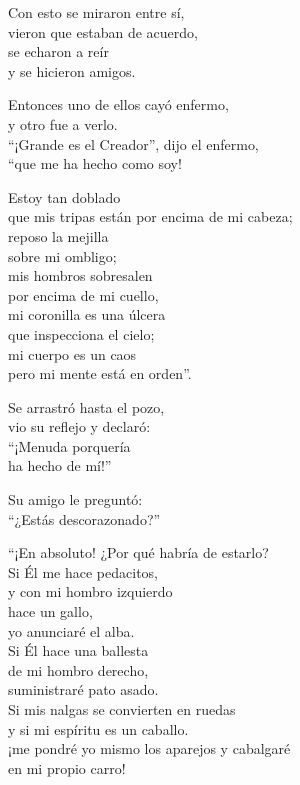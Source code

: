 \documentclass[hidelinks]{memoir}
\begin{document}
	Con esto se miraron entre sí,\\
	vieron que estaban de acuerdo,\\
	se echaron a reír\\
	y se hicieron amigos.
	
	Entonces uno de ellos cayó enfermo,\\
	y otro fue a verlo.\\
	``¡Grande es el Creador'', dijo el enfermo,\\
	``que me ha hecho como soy!
	
	Estoy tan doblado\\
	que mis tripas están por encima de mi cabeza;\\
	reposo la mejilla\\
	sobre mi ombligo;\\
	mis hombros sobresalen\\
	por encima de mi cuello,\\
	mi coronilla es una úlcera\\
	que inspecciona el cielo;\\
	mi cuerpo es un caos\\
	pero mi mente está en orden''.
	
	Se arrastró hasta el pozo,\\
	vio su reflejo y declaró:\\
	``¡Menuda porquería\\
	ha hecho de mí!''
	
	Su amigo le preguntó:\\
	``¿Estás descorazonado?''
	
	``¡En absoluto! ¿Por qué habría de estarlo?\\
	Si Él me hace pedacitos,\\
	y con mi hombro izquierdo\\
	hace un gallo,\\
	yo anunciaré el alba.\\
	Si Él hace una ballesta\\
	de mi hombro derecho,\\
	suministraré pato asado.\\
	Si mis nalgas se convierten en ruedas\\
	y si mi espíritu es un caballo.\\
	¡me pondré yo mismo los aparejos y cabalgaré\\
	en mi propio carro!
	
\end{document}
